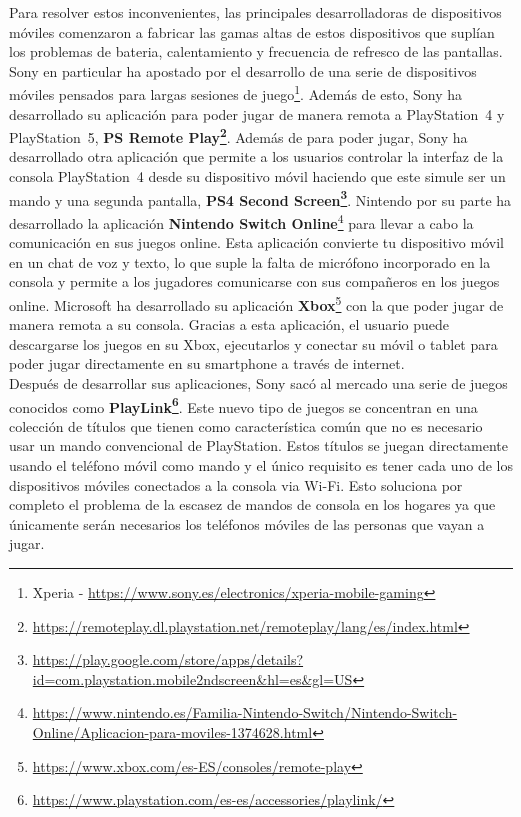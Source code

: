Para resolver estos inconvenientes, las principales desarrolladoras de dispositivos m\'oviles comenzaron a fabricar las gamas altas de estos dispositivos que supl\'ian los problemas de bateria, calentamiento y frecuencia de refresco de las pantallas. Sony en particular ha apostado por el desarrollo de una serie de dispositivos m\'oviles pensados para largas sesiones de juego\footnote{Xperia -  \url{https://www.sony.es/electronics/xperia-mobile-gaming}}. Adem\'as de esto, Sony ha desarrollado su aplicaci\'on para poder jugar de manera remota a PlayStation~4 y PlayStation~5, \textbf{PS Remote Play\footnote{\url{https://remoteplay.dl.playstation.net/remoteplay/lang/es/index.html}}}. Adem\'as de para poder jugar, Sony ha desarrollado otra aplicaci\'on que permite a los usuarios controlar la interfaz de la consola PlayStation~4 desde su dispositivo m\'ovil haciendo que este simule ser un mando y una segunda pantalla, \textbf{PS4 Second Screen\footnote{\url{https://play.google.com/store/apps/details?id=com.playstation.mobile2ndscreen&hl=es&gl=US}}}.
Nintendo por su parte ha desarrollado la aplicaci\'on \textbf{Nintendo Switch Online}\footnote{\url{https://www.nintendo.es/Familia-Nintendo-Switch/Nintendo-Switch-Online/Aplicacion-para-moviles-1374628.html}} para llevar a cabo la comunicaci\'on en sus juegos online. Esta aplicaci\'on convierte tu dispositivo m\'ovil en un chat de voz y texto, lo que suple la falta de micr\'ofono incorporado en la consola y permite a los jugadores comunicarse con sus compa\~neros en los juegos online. Microsoft ha desarrollado su aplicaci\'on \textbf{Xbox}\footnote{\url{https://www.xbox.com/es-ES/consoles/remote-play}} con la que poder jugar de manera remota a su consola. Gracias a esta aplicaci\'on, el usuario puede descargarse los juegos en su Xbox, ejecutarlos y conectar su m\'ovil o tablet para poder jugar directamente en su smartphone a trav\'es de internet.\\

Despu\'es de desarrollar sus aplicaciones, Sony sac\'o al mercado una serie de juegos conocidos como \textbf{PlayLink\footnote{\url{https://www.playstation.com/es-es/accessories/playlink/}}}. Este nuevo tipo de juegos se concentran en una colecci\'on de t\'itulos que tienen como caracter\'istica com\'un que no es necesario usar un mando convencional de PlayStation. Estos t\'itulos se juegan directamente usando el tel\'efono m\'ovil como mando y el \'unico requisito es tener cada uno de los dispositivos m\'oviles conectados a la consola via Wi-Fi. Esto soluciona por completo el problema de la escasez de mandos de consola en los hogares ya que \'unicamente ser\'an necesarios los tel\'efonos m\'oviles de las personas que vayan a jugar.\\

